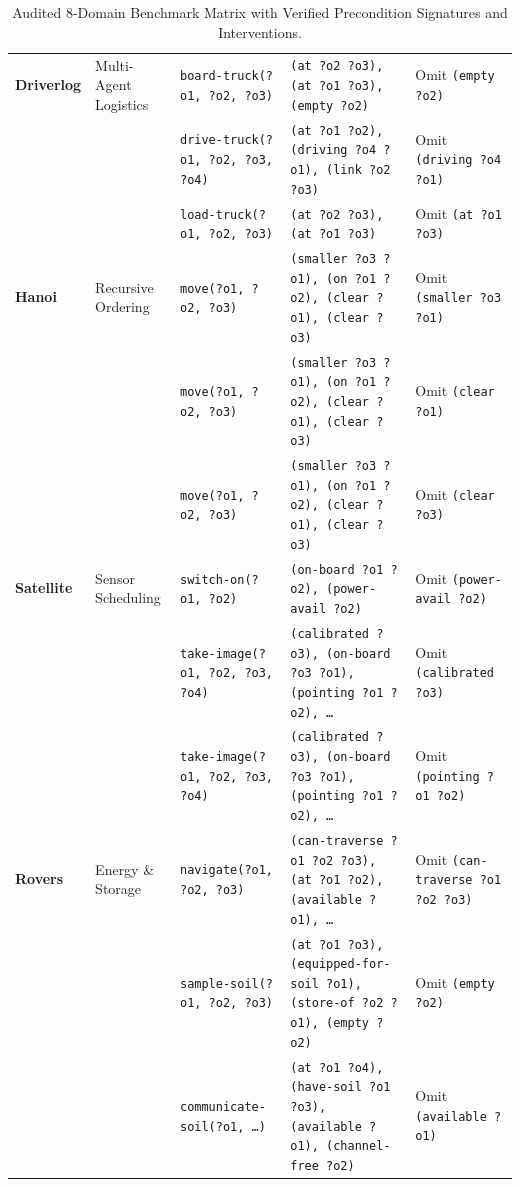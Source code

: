 \documentclass[11pt,a4paper]{article}
\theoremstyle{definition}
\begin{document}
\begin{table}[h!]
\begin{tabular}{lllll}
\midrule
\textbf{Driverlog}   & Multi-Agent Logistics& \texttt{board-truck(?o1, ?o2, ?o3)} & \texttt{(at ?o2 ?o3), (at ?o1 ?o3), (empty ?o2)} & Omit \texttt{(empty ?o2)} \\
                     &                     & \texttt{drive-truck(?o1, ?o2, ?o3, ?o4)} & \texttt{(at ?o1 ?o2), (driving ?o4 ?o1), (link ?o2 ?o3)} & Omit \texttt{(driving ?o4 ?o1)} \\
                     &                     & \texttt{load-truck(?o1, ?o2, ?o3)} & \texttt{(at ?o2 ?o3), (at ?o1 ?o3)}            & Omit \texttt{(at ?o1 ?o3)} \\
\midrule
\textbf{Hanoi}       & Recursive Ordering  & \texttt{move(?o1, ?o2, ?o3)}& \texttt{(smaller ?o3 ?o1), (on ?o1 ?o2), (clear ?o1), (clear ?o3)} & Omit \texttt{(smaller ?o3 ?o1)} \\
                     &                     & \texttt{move(?o1, ?o2, ?o3)}& \texttt{(smaller ?o3 ?o1), (on ?o1 ?o2), (clear ?o1), (clear ?o3)} & Omit \texttt{(clear ?o1)} \\
                     &                     & \texttt{move(?o1, ?o2, ?o3)}& \texttt{(smaller ?o3 ?o1), (on ?o1 ?o2), (clear ?o1), (clear ?o3)} & Omit \texttt{(clear ?o3)} \\
\midrule
\textbf{Satellite}   & Sensor Scheduling   & \texttt{switch-on(?o1, ?o2)}& \texttt{(on-board ?o1 ?o2), (power-avail ?o2)} & Omit \texttt{(power-avail ?o2)} \\
                     &                     & \texttt{take-image(?o1, ?o2, ?o3, ?o4)} & \texttt{(calibrated ?o3), (on-board ?o3 ?o1), (pointing ?o1 ?o2), \dots} & Omit \texttt{(calibrated ?o3)} \\
                     &                     & \texttt{take-image(?o1, ?o2, ?o3, ?o4)} & \texttt{(calibrated ?o3), (on-board ?o3 ?o1), (pointing ?o1 ?o2), \dots} & Omit \texttt{(pointing ?o1 ?o2)} \\
\midrule
\textbf{Rovers}      & Energy \& Storage   & \texttt{navigate(?o1, ?o2, ?o3)}    & \texttt{(can-traverse ?o1 ?o2 ?o3), (at ?o1 ?o2), (available ?o1), \dots} & Omit \texttt{(can-traverse ?o1 ?o2 ?o3)} \\
                     &                     & \texttt{sample-soil(?o1, ?o2, ?o3)} & \texttt{(at ?o1 ?o3), (equipped-for-soil ?o1), (store-of ?o2 ?o1), (empty ?o2)} & Omit \texttt{(empty ?o2)} \\
                     &                     & \texttt{communicate-soil(?o1, \dots)} & \texttt{(at ?o1 ?o4), (have-soil ?o1 ?o3), (available ?o1), (channel-free ?o2)} & Omit \texttt{(available ?o1)} \\
\bottomrule
\end{tabular}
\caption{Audited 8-Domain Benchmark Matrix with Verified Precondition Signatures and Interventions.}
\end{table}
\end{document}
